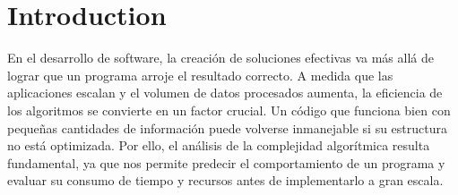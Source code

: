 \documentclass[pdflatex,sn-mathphys-num]{sn-jnl}%
\theoremstyle{thmstyleone}%
\theoremstyle{thmstyletwo}%
\theoremstyle{thmstylethree}%
\begin{document}
% 
% 
% 




\maketitle

\section{Introduction}\label{sec1}
En el desarrollo de software, la creación de soluciones efectivas va más allá de lograr que un programa arroje el resultado correcto. A medida que las aplicaciones escalan y el volumen de datos procesados aumenta, la eficiencia de los algoritmos se convierte en un factor crucial. Un código que funciona bien con pequeñas cantidades de información puede volverse inmanejable si su estructura no está optimizada. Por ello, el análisis de la complejidad algorítmica resulta fundamental, ya que nos permite predecir el comportamiento de un programa y evaluar su consumo de tiempo y recursos antes de implementarlo a gran escala.
\end{document}

